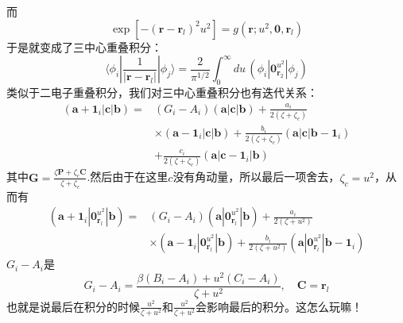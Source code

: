\documentclass[12pt,a4paper,openany,twoside]{article}
\numberwithin{equation}{section}
\begin{document}
                而
                \begin{equation}
                    \exp \left[-\left(\boldsymbol{r}-\boldsymbol{r}_{l}\right)^{2} u^{2}\right] = g(\boldsymbol{r};u^2,\boldsymbol{0},\boldsymbol{r}_l)
                \end{equation}
                于是就变成了三中心重叠积分：
                \begin{equation}
                    \langle \phi_i | \frac{1}{|\boldsymbol{r} - \boldsymbol{r}_l|} |\phi_j \rangle = \frac{2}{\pi^{1 / 2}} \int_0^\infty du \, (\phi_i|\boldsymbol{0}_{\boldsymbol{r}_2}^{u^2}|\phi_j)
                \end{equation}
                类似于二电子重叠积分，我们对三中心重叠积分也有迭代关系：
                \begin{equation}
                \begin{aligned}
                    \left(\boldsymbol{a}+\boldsymbol{1}_{i}|\boldsymbol{c}| \boldsymbol{b}\right)=&\left(G_{i}-A_{i}\right)(\boldsymbol{a}|\boldsymbol{c}| \boldsymbol{b})+\frac{a_i}{2\left(\zeta+\zeta_{c}\right)} \\ 
                & \times \left(\boldsymbol{a}-\boldsymbol{1}_{i}|\boldsymbol{c}| \boldsymbol{b}\right)+\frac{ b_i}{2\left(\zeta+\zeta_{c}\right)} \left(\boldsymbol{a} | \boldsymbol{c}|\boldsymbol{b}-\boldsymbol{1}_{i}\right)\\ 
                &+\frac{c_i}{2\left(\zeta+\zeta_{c}\right)}\left(\boldsymbol{a}\left|\boldsymbol{c}-\boldsymbol{1}_{i}\right| \boldsymbol{b}\right)
                \end{aligned}
                \end{equation}
                其中$\boldsymbol{G}=\frac{\zeta \boldsymbol{P}+\zeta_{c} \boldsymbol{C}}{\zeta+\zeta_{c}}$.然后由于在这里$c$没有角动量，所以最后一项舍去，$\zeta_c = u^2$，从而有
                \begin{equation}
                    \begin{aligned}
                    \left(\boldsymbol{a}+\boldsymbol{1}_{i}|\boldsymbol{0}_{\boldsymbol{r}_l}^{u^2}| \boldsymbol{b}\right)= & \left(G_{i}-A_{i}\right)(\boldsymbol{a}|\boldsymbol{0}_{\boldsymbol{r}_l}^{u^2}| \boldsymbol{b})+\frac{a_i}{2\left(\zeta + u^2\right)} \\ 
                    & \times \left(\boldsymbol{a}-\boldsymbol{1}_{i}|\boldsymbol{0}_{\boldsymbol{r}_l}^{u^2}| \boldsymbol{b}\right)+\frac{ b_i}{2\left(\zeta + u^2\right)} \left(\boldsymbol{a} | \boldsymbol{0}_{\boldsymbol{r}_l}^{u^2}|\boldsymbol{b}-\boldsymbol{1}_{i}\right)
                    \end{aligned}
                \end{equation}
                $G_i-A_i$是
                \begin{equation}
                    G_i - A_i = \frac{\beta (B_i-A_i) + u^2 (C_i - A_i)}{\zeta + u^2}, \quad \boldsymbol{C} = \boldsymbol{r}_l
                \end{equation}
                也就是说最后在积分的时候$\frac{u^2}{\zeta+u^2}$和$\frac{u^2}{\zeta+u^2}$会影响最后的积分。这怎么玩嘛！
\end{document}
